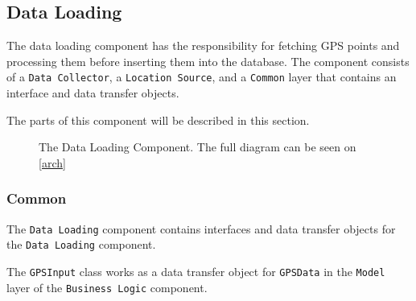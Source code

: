 \subsection{Data Loading}\label{arch:data_loading_component}
The data loading component has the responsibility for fetching GPS points and processing them before inserting them into the database.
The component consists of a \texttt{Data Collector}, a \texttt{Location Source}, and a \texttt{Common} layer that contains an interface and data transfer objects.

The parts of this component will be described in this section.
\begin{figure}[h]
\centering
{}
\caption{The Data Loading Component. The full diagram can be seen on \cref{arch}}
\label{dataloadingcomponent}
\end{figure}

\subsubsection{Common}
The \texttt{Data Loading} component contains interfaces and data transfer objects for the \texttt{Data Loading} component.

The \lstinline!GPSInput! class works as a data transfer object for \lstinline!GPSData! in the \texttt{Model} layer of the \texttt{Business Logic} component.

